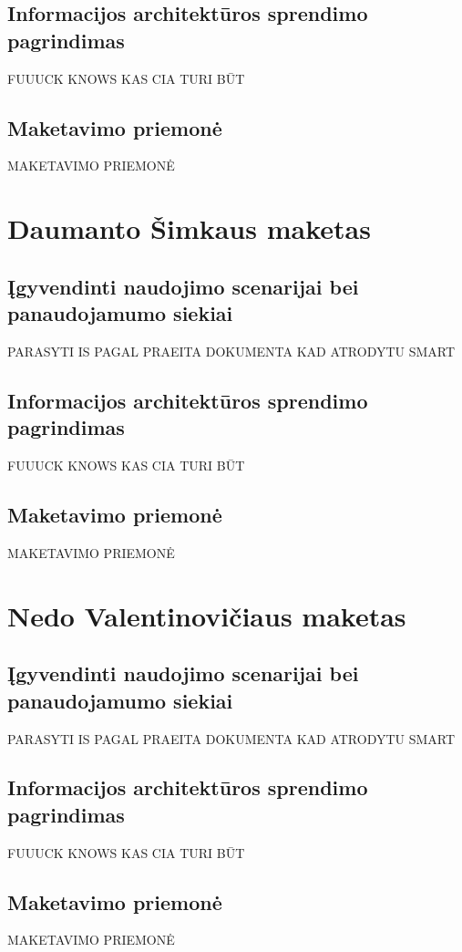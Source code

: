 \documentclass{VUMIFPSkursinis}
\begin{document}
\subsection{Informacijos architektūros sprendimo pagrindimas}
FUUUCK KNOWS KAS CIA TURI BŪT

\subsection{Maketavimo priemonė}
MAKETAVIMO PRIEMONĖ

\section{Daumanto Šimkaus maketas}
\subsection{Įgyvendinti naudojimo scenarijai bei panaudojamumo siekiai}
PARASYTI IS PAGAL PRAEITA DOKUMENTA KAD ATRODYTU SMART

\subsection{Informacijos architektūros sprendimo pagrindimas}
FUUUCK KNOWS KAS CIA TURI BŪT

\subsection{Maketavimo priemonė}
MAKETAVIMO PRIEMONĖ

\section{Nedo Valentinovičiaus maketas}
\subsection{Įgyvendinti naudojimo scenarijai bei panaudojamumo siekiai}
PARASYTI IS PAGAL PRAEITA DOKUMENTA KAD ATRODYTU SMART

\subsection{Informacijos architektūros sprendimo pagrindimas}
FUUUCK KNOWS KAS CIA TURI BŪT

\subsection{Maketavimo priemonė}
MAKETAVIMO PRIEMONĖ

\printbibliography[heading=bibintoc, title=Šaltiniai]  %
\end{document}
